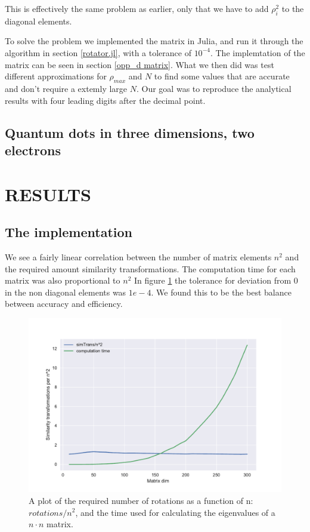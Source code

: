 \documentclass[a4paper]{article}
\begin{document}
This is effectively the same problem as earlier, only that we have to add $\rho_{i}^2$ to the diagonal elements. 

To solve the problem we implemented the matrix in Julia, and run it through the algorithm in section \ref{rotator.jl}, with a tolerance of $10^{-4}$. The implemtation of the matrix can be seen in section \ref{opp_d matrix}. What we then did was test different approximations for $\rho_{max}$ and $N$ to find some values that are accurate and don't require a extemly large $N$. Our goal was to reproduce the analytical results with four leading digits after the decimal point.

\subsection{Quantum dots in three dimensions, two electrons}


\section{RESULTS}
\subsection{The implementation}
We see a fairly linear correlation between the number of matrix elements $n^2$ and the required amount similarity transformations. The computation time for each matrix was also proportional to $n^2$ In figure \ref{computation time plot} the tolerance for deviation from 0 in the non diagonal elements was $1e-4$. We found this to be the best balance between accuracy and efficiency. 
\begin{figure}[h!]
	\centering 
	\includegraphics[scale=0.7]{../requiredRotations.pdf}
	\caption{A plot of the required number of rotations as a function of n: $rotations/n^2$, and the time used for calculating the eigenvalues of a $n\cdot n$ matrix.}
	\label{computation time plot}
\end{figure}
\end{document}
